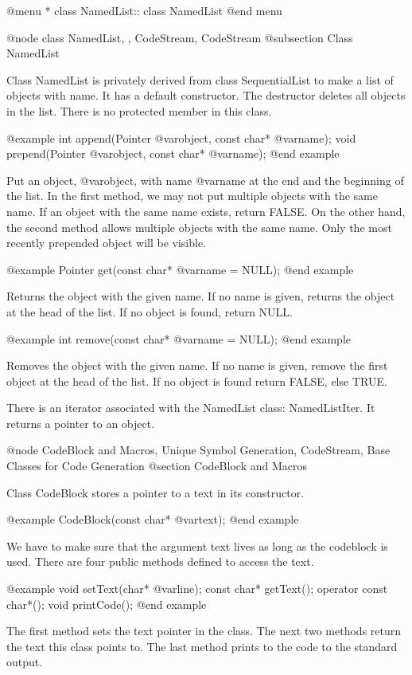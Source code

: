 @menu
* class NamedList::			class NamedList
@end menu

@node class NamedList, , CodeStream, CodeStream
@subsection Class NamedList

Class NamedList is privately derived from class SequentialList to make
a list of objects with name. It has a default constructor. The destructor
deletes all objects in the list. There is no protected member in this class.

@example
int append(Pointer @var{object}, const char* @var{name});
void prepend(Pointer @var{object}, const char* @var{name});
@end example

Put an object, @var{object}, with name @var{name} at the end and the
beginning of the list. In the first method, we may not put multiple
objects with the same name. If an object with the same name exists, return
FALSE. On the other hand, the second method allows multiple objects with
the same name. Only the most recently prepended object will be visible.

@example
Pointer get(const char* @var{name} = NULL);
@end example

Returns the object with the given name. If no name is given, returns the
object at the head of the list. If no object is found, return NULL.

@example
int remove(const char* @var{name} = NULL);
@end example

Removes the object with the given name. If no name is given, remove the first
object at the head of the list. If no object is found return FALSE, else TRUE.

There is an iterator associated with the NamedList class: NamedListIter.
It returns a pointer to an object.

@node CodeBlock and Macros, Unique Symbol Generation, CodeStream, Base Classes for Code Generation
@section CodeBlock and Macros

Class CodeBlock stores a pointer to a text in its constructor.

@example
CodeBlock(const char* @var{text});
@end example

We have to make sure that the argument text lives as long as the codeblock is
used. There are four public methods defined to access the text.

@example
void setText(char* @var{line});
const char* getText();
operator const char*();
void printCode();
@end example

The first method sets the text pointer in the class. The next two methods
return the text this class points to. The last method prints to the code to
the standard output.

